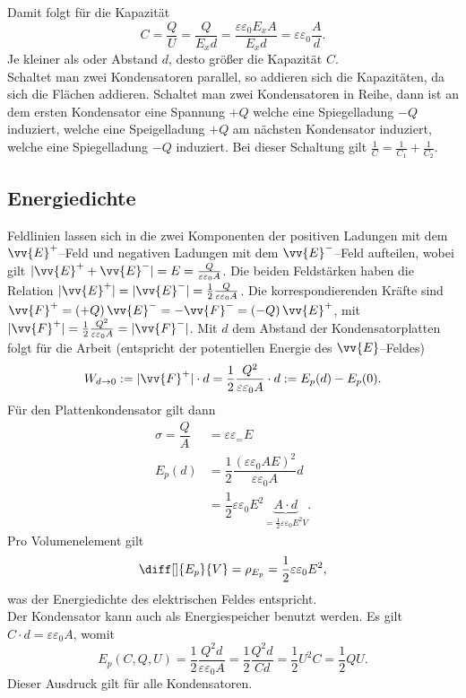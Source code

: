 Damit folgt für die Kapazität
\[ 
        C=\dfrac{Q}{U}=\dfrac{Q}{E_xd}=\dfrac{\varepsilon \varepsilon _0E_xA}{E_xd}=\varepsilon \varepsilon _0\dfrac{A}{d}
.\] 
Je kleiner als oder Abstand $d$, desto größer die Kapazität $C$.\\\indent
Schaltet man zwei Kondensatoren parallel, so addieren sich die Kapazitäten, da sich die Flächen addieren. Schaltet man zwei Kondensatoren in Reihe, dann ist an dem ersten Kondensator eine Spannung $+Q$ welche eine Spiegelladung $-Q$ induziert, welche eine Speigelladung $+Q$ am nächsten Kondensator induziert, welche eine Spiegelladung $-Q$ induziert. Bei dieser Schaltung gilt $\tfrac{1}{C}=\tfrac{1}{C_1}+\tfrac{1}{C_2}$.

\subsection{Energiedichte}
Feldlinien lassen sich in die zwei Komponenten der positiven Ladungen mit dem $\vv{E}^+$--Feld und negativen Ladungen mit dem $\vv{E}^-$--Feld aufteilen, wobei gilt $|\vv{E}^++\vv{E}^-|=E=\tfrac{Q}{\varepsilon \varepsilon _0A}$. Die beiden Feldstärken haben die Relation $|\vv{E}^+|=|\vv{E}^-|=\tfrac{1}{2}\tfrac{Q}{\varepsilon \varepsilon _0A}$. Die korrespondierenden Kräfte sind $\vv{F}^+=\left(+Q\right)\vv{E}^-=-\vv{F}^-=\left(-Q\right)\vv{E}^+$, mit $|\vv{F}^+|=\tfrac{1}{2}\tfrac{Q^2}{\varepsilon \varepsilon _0A}=|\vv{F}^-|$. Mit $d$ dem Abstand der Kondensatorplatten folgt für die Arbeit (entspricht der potentiellen Energie des $\vv{E}$--Feldes)
\[ 
        W_{d\rightarrow 0}:=|\vv{F}^+|\cdot d=\dfrac{1}{2}\dfrac{Q^2}{\varepsilon \varepsilon _0A}\cdot d:=E_p(d)-E_p(0)
.\] 
Für den Plattenkondensator gilt dann
\begin{align*}
        \sigma =\dfrac{Q}{A}&=\varepsilon \varepsilon _=E\\
        E_p\left(d\right)&=\dfrac{1}{2}\dfrac{\left(\varepsilon \varepsilon _0AE\right)^2}{\varepsilon \varepsilon _0A}d\\
                         &=\dfrac{1}{2}\varepsilon \varepsilon _0E^2\underbrace{A\cdot d}_{=\tfrac{1}{2}\varepsilon \varepsilon _0E^2V}
.\end{align*}
Pro Volumenelement gilt
\[ 
        \diff[]{E_p}{V}=\rho _{E_p}=\dfrac{1}{2}\varepsilon \varepsilon _0E^2
,\] 
was der Energiedichte des elektrischen Feldes entspricht.\\\indent
Der Kondensator kann auch als Energiespeicher benutzt werden. Es gilt $C\cdot d=\varepsilon \varepsilon _0A$, womit
\[ 
        E_p\left(C,Q,U\right)=\dfrac{1}{2}\dfrac{Q^2d}{\varepsilon \varepsilon _0A}=\dfrac{1}{2}\dfrac{Q^2d}{Cd}=\dfrac{1}{2}U^2C=\dfrac{1}{2}QU
.\] 
Dieser Ausdruck gilt für alle Kondensatoren.

